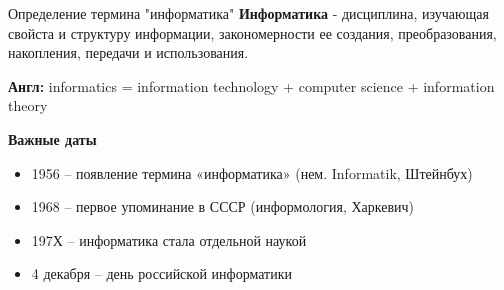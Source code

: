 \begin{frame}{Определение термина "информатика"}
\noindent\color[rgb]{0,0.7,0.4}\textbf{Информатика}
\color{black}
- дисциплина, изучающая свойста и структуру информации, закономерности ее создания,
преобразования, накопления, передачи и использования.

\noindent\color[rgb]{0,0.7,0.4}\textbf{Англ: }
\color{black}
informatics = information technology + computer science + information theory
\vspace{1.0em}
\begin{center}
	\textbf{Важные даты}
\end{center}
\begin{itemize}
	\item[\textbullet] 1956 – появление термина «информатика» (нем. Informatik, Штейнбух)
	\item[\textbullet] 1968 – первое упоминание в СССР (информология, Харкевич)
	\item[\textbullet] 197Х – информатика стала отдельной наукой
	\item[\textbullet] 4 декабря – день российской информатики
\end{itemize}
\end{frame}